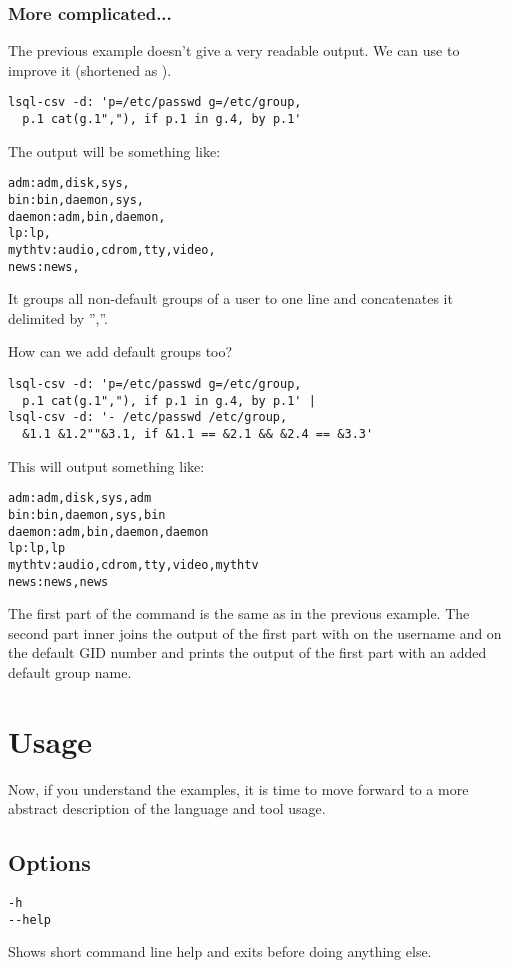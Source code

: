 \subsubsection{More complicated...}
The previous example doesn't give a very readable output. We can use  to improve it (shortened as ).
\begin{verbatim}
lsql-csv -d: 'p=/etc/passwd g=/etc/group, 
  p.1 cat(g.1","), if p.1 in g.4, by p.1'
\end{verbatim}
The output will be something like:
\begin{verbatim}
adm:adm,disk,sys,
bin:bin,daemon,sys,
daemon:adm,bin,daemon,
lp:lp,
mythtv:audio,cdrom,tty,video,
news:news,
\end{verbatim}
It groups all non-default groups of a user to one line and concatenates it delimited by '',''.

How can we add default groups too?
\begin{verbatim}
lsql-csv -d: 'p=/etc/passwd g=/etc/group, 
  p.1 cat(g.1","), if p.1 in g.4, by p.1' |
lsql-csv -d: '- /etc/passwd /etc/group, 
  &1.1 &1.2""&3.1, if &1.1 == &2.1 && &2.4 == &3.3'
\end{verbatim}
This will output something like:
\begin{verbatim}
adm:adm,disk,sys,adm
bin:bin,daemon,sys,bin
daemon:adm,bin,daemon,daemon
lp:lp,lp
mythtv:audio,cdrom,tty,video,mythtv
news:news,news
\end{verbatim}

The first part of the command is the same as in the previous example. The second part inner joins the output
of the first part with  on the username and  on the default GID number and prints
the output of the first part with an added default group name.



\section{Usage}
Now, if you understand the examples, it is time to move forward to a more abstract description of the language and tool usage.

\subsection{Options}
\begin{verbatim}
-h
--help
\end{verbatim}
Shows short command line help and exits before doing anything else.

